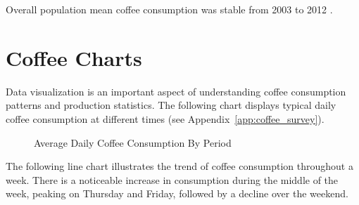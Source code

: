 \documentclass{uofithesis}
\begin{document}
Overall population mean coffee consumption was stable from 2003 to 2012
\cite{LOFTFIELD20161762}.

\section{Coffee Charts}

Data visualization is an important aspect of understanding coffee consumption
patterns and production statistics. The following chart displays typical daily
coffee consumption at different times (see Appendix~\ref{app:coffee_survey}).

\begin{figure}
    \caption{Average Daily Coffee Consumption By Period}
    \medskip
    \label{fig:coffee_consumption_chart}
\end{figure}
\bigskip

The following line chart illustrates the trend of coffee consumption throughout
a week. There is a noticeable increase in consumption during the middle of the
week, peaking on Thursday and Friday, followed by a decline over the weekend.
\end{document}
